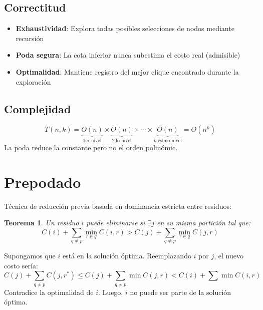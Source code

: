 \documentclass[letterpaper, 12pt]{report}
\newtheorem*{theorem*}{Teorema}
\begin{document}

\subsection{Correctitud}
\begin{itemize}
\item \textbf{Exhaustividad}: Explora todas posibles selecciones de nodos mediante recursión
\item \textbf{Poda segura}: La cota inferior nunca subestima el costo real (admisible)
\item \textbf{Optimalidad}: Mantiene registro del mejor clique encontrado durante la exploración
\end{itemize}

\subsection{Complejidad}

\[
T(n,k) = \underbrace{O(n)}_{\text{1er nivel}} \times \underbrace{O(n)}_{\text{2do nivel}} \times \cdots \times \underbrace{O(n)}_{k\text{-ésimo nivel}} = O(n^k)
\]
La poda reduce la constante pero no el orden polinómic.

\section{Prepodado}

Técnica de reducción previa basada en dominancia estricta entre residuos:

\begin{theorem*}
Un residuo $i$ puede eliminarse si $\exists j$ en su misma partición tal que:
\[
C(i) + \sum_{q \neq p} \min_{r \in q} C(i,r) > C(j) + \sum_{q \neq p} \min_{r \in q} C(j,r)
\]
\end{theorem*}

Supongamos que $i$ está en la solución óptima. Reemplazando $i$ por $j$, el nuevo costo sería:
\[
C(j) + \sum_{q \neq p} C(j,r^*) \leq C(j) + \sum_{q \neq p} \min C(j,r) < C(i) + \sum \min C(i,r)
\]
Contradice la optimalidad de $i$. Luego, $i$ no puede ser parte de la solución óptima.


\end{document}
